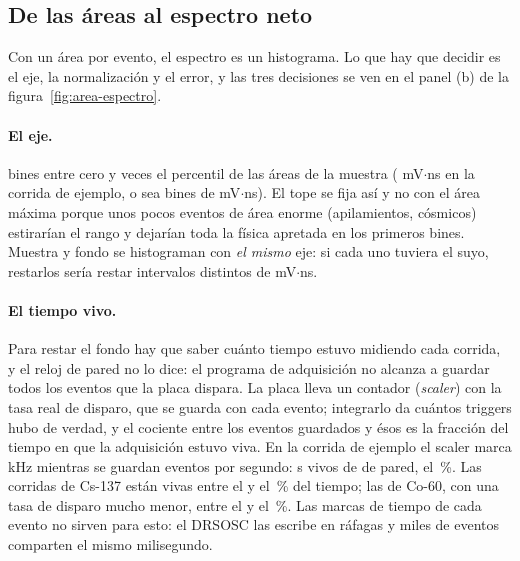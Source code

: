 \documentclass[11pt,a4paper]{article}
\begin{document}
\subsection{De las áreas al espectro neto}
\label{sec:areas-espectro}

Con un área por evento, el espectro es un histograma. Lo que hay que decidir
es el eje, la normalización y el error, y las tres decisiones se ven en el
panel (b) de la figura~\ref{fig:area-espectro}.

\paragraph{El eje.} \NBins{} bines entre cero y \RangoFactor{} veces el
percentil \RangoPercentil{} de las áreas de la muestra (\EjRangoMax{} mV$\cdot$ns
en la corrida de ejemplo, o sea bines de \EjAnchoBin{} mV$\cdot$ns). El tope
se fija así y no con el área máxima porque unos pocos eventos de área enorme
(apilamientos, cósmicos) estirarían el rango y dejarían toda la física apretada
en los primeros bines. Muestra y fondo se histograman con \emph{el mismo} eje:
si cada uno tuviera el suyo, restarlos sería restar intervalos distintos de
mV$\cdot$ns.

\paragraph{El tiempo vivo.} Para restar el fondo hay que saber cuánto tiempo
estuvo midiendo cada corrida, y el reloj de pared no lo dice: el programa de
adquisición no alcanza a guardar todos los eventos que la placa dispara. La
placa lleva un contador (\emph{scaler}) con la tasa real de disparo, que se
guarda con cada evento; integrarlo da cuántos triggers hubo de verdad, y el
cociente entre los eventos guardados y ésos es la fracción del tiempo en que
la adquisición estuvo viva. En la corrida de ejemplo el scaler marca
\EjScaler{} kHz mientras se guardan \EjTasaGuardada{} eventos por segundo:
\EjTVivo{} s vivos de \EjTPared{} de pared, el \EjViva\,\%. Las corridas de
Cs-137 están vivas entre el \VivaCsMin{} y el \VivaCsMax\,\% del tiempo; las de
Co-60, con una tasa de disparo mucho menor, entre el \VivaCoMin{} y el
\VivaCoMax\,\%. Las marcas de tiempo de cada evento no sirven para esto: el
DRSOSC las escribe en ráfagas y miles de eventos comparten el mismo
milisegundo.
\end{document}
